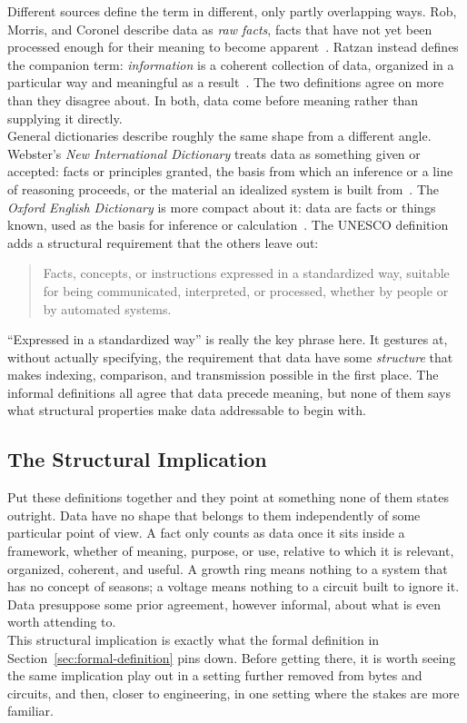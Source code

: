 Different sources define the term in different, only partly overlapping ways.
Rob, Morris, and Coronel describe data as \emph{raw facts}, facts that have not
yet been processed enough for their meaning to become
apparent~\autocite{rob2013}. Ratzan instead defines the companion term:
\emph{information} is a coherent collection of data, organized in a particular
way and meaningful as a result~\autocite{ratzan2004}. The two definitions
agree on more than they disagree about. In both, data come before meaning
rather than supplying it directly.\\
General dictionaries describe roughly the same shape from a different angle.
Webster's \textit{New International Dictionary} treats data as something given
or accepted: facts or principles granted, the basis from which an inference or
a line of reasoning proceeds, or the material an idealized system is built
from~\autocite{websters1934}. The \textit{Oxford English Dictionary} is more
compact about it: data are facts or things known, used as the basis for
inference or calculation~\autocite{oed2023}. The UNESCO definition adds a
structural requirement that the others leave out:

\begin{quote}
Facts, concepts, or instructions expressed in a standardized way, suitable for
being communicated, interpreted, or processed, whether by people or by
automated systems.~\autocite{unesco2008}
\end{quote}

``Expressed in a standardized way'' is really the key phrase here. It gestures
at, without actually specifying, the requirement that data have some
\emph{structure} that makes indexing, comparison, and transmission possible in
the first place. The informal definitions all agree that data precede meaning,
but none of them says what structural properties make data addressable to
begin with.
\newpage
\subsection{The Structural Implication}

Put these definitions together and they point at something none of them states
outright. Data have no shape that belongs to them independently of some
particular point of view. A fact only counts as data once it sits inside a
framework, whether of meaning, purpose, or use, relative to which it is
relevant, organized, coherent, and useful. A growth ring means nothing to a
system that has no concept of seasons; a voltage means nothing to a circuit
built to ignore it. Data presuppose some prior agreement, however informal,
about what is even worth attending to.\\
This structural implication is exactly what the formal definition in
Section~\ref{sec:formal-definition} pins down. Before getting there, it is
worth seeing the same implication play out in a setting further removed from
bytes and circuits, and then, closer to engineering, in one setting where the
stakes are more familiar.

